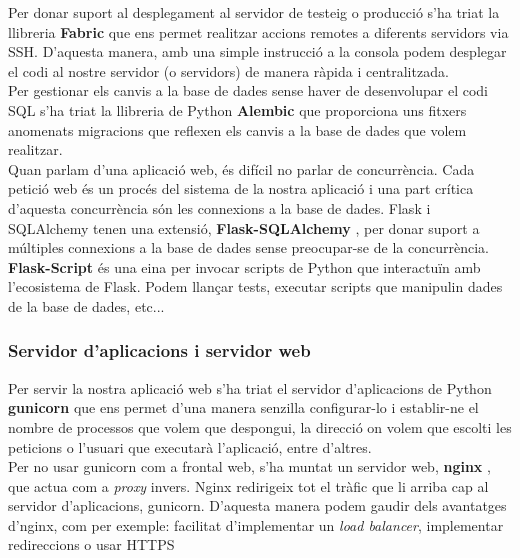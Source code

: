 	Per donar suport al desplegament al servidor de testeig o producció s'ha triat la llibreria \textbf{Fabric} \cite{fabric} que ens permet realitzar accions remotes a diferents servidors via \ac{SSH}. D'aquesta manera, amb una simple instrucció a la consola podem desplegar el codi al nostre servidor (o servidors) de manera ràpida i centralitzada.\\

	Per gestionar els canvis a la base de dades sense haver de desenvolupar el codi \ac{SQL} s'ha triat la llibreria de Python \textbf{Alembic} \cite{alembic} que proporciona uns fitxers anomenats migracions que reflexen els canvis a la base de dades que volem realitzar.\\

	Quan parlam d'una aplicació web, és difícil no parlar de concurrència. Cada petició web és un procés del sistema de la nostra aplicació i una part crítica d'aquesta concurrència són les connexions a la base de dades. Flask i SQLAlchemy tenen una extensió, \textbf{Flask-SQLAlchemy} \cite{flask_sqlalchemy}, per donar suport a múltiples connexions a la base de dades sense preocupar-se de la concurrència. \\

	\textbf{Flask-Script} \cite{flask_script} és una eina per invocar scripts de Python que interactuïn amb l'ecosistema de Flask. Podem llançar tests, executar scripts que manipulin dades de la base de dades, etc...\\
	

	\subsubsection{Servidor d'aplicacions i servidor web}
	
	Per servir la nostra aplicació web s'ha triat el servidor d'aplicacions de Python \textbf{gunicorn} \cite{gunicorn} que ens permet d'una manera senzilla configurar-lo i establir-ne el nombre de processos que volem que despongui, la direcció on volem que escolti les peticions o l'usuari que executarà l'aplicació, entre d'altres.\\

	Per no usar gunicorn com a frontal web, s'ha muntat un servidor web, \textbf{nginx} \cite{nginx}, que actua com a \emph{proxy} invers. Nginx redirigeix tot el tràfic que li arriba cap al servidor d'aplicacions, gunicorn. D'aquesta manera podem gaudir dels avantatges d'nginx, com per exemple: facilitat d'implementar un \emph{load balancer}, implementar redireccions o usar \ac{HTTPS}

